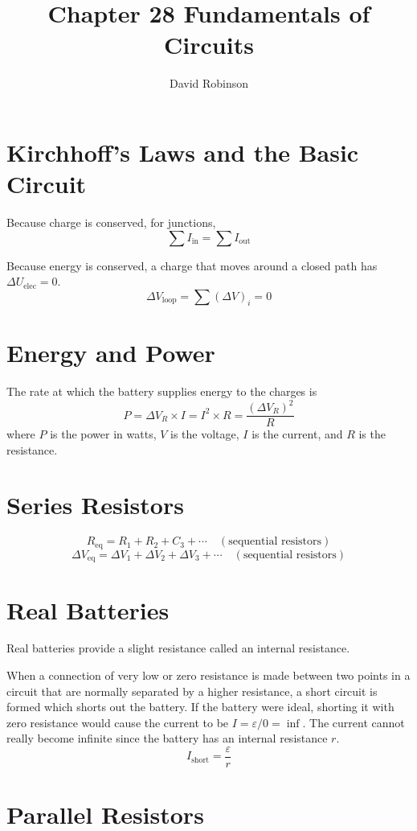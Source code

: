 \documentclass{article}
\title{Chapter 28 Fundamentals of Circuits}
\author{David Robinson}
\date{}
\begin{document}
\maketitle

\section*{Kirchhoff's Laws and the Basic Circuit}
Because charge is conserved, for junctions,
\[\sum I_\text{in}=\sum I_\text{out}\]

Because energy is conserved, a charge that moves around a closed path has $\Delta U_\text{elec}=0$.
\[\Delta V_\text{loop}=\sum {(\Delta V)}_i=0\]

\section*{Energy and Power}
The rate at which the battery supplies energy to the charges is
\[P=\Delta V_R\times I=I^2 \times R=\frac{{(\Delta V_R)}^2}{R}\] where $P$ is the power in watts,
$V$ is the voltage, $I$ is the current, and $R$ is the resistance.

\section*{Series Resistors}

\[R_\text{eq}=R_1 + R_2 + C_3 + \cdots\quad (\text{sequential resistors})\]
\[\Delta V_\text{eq}=\Delta V_1 + \Delta V_2 + \Delta V_3 + \cdots\quad
(\text{sequential resistors})\]

\section*{Real Batteries}
Real batteries provide a slight resistance called an internal resistance.

\vspace{1em}

When a connection of very low or zero resistance is made between two points in a circuit that are
normally separated by a higher resistance, a short circuit is formed which shorts out the battery.
If the battery were ideal, shorting it with zero resistance would cause the current to be
$I=\varepsilon / 0=\inf$. The current cannot really become infinite since the battery has an
internal resistance $r$.
\[I_\text{short}=\frac{\varepsilon}{r}\]

\section*{Parallel Resistors}
\end{document}
